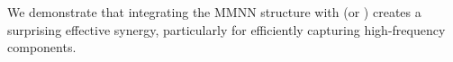 \documentclass[11pt,a4paper]{article}
\begin{document}


We demonstrate that integrating the MMNN structure with \sine{} (or ) creates a surprising effective synergy, particularly for efficiently capturing high-frequency components.
\end{document}
